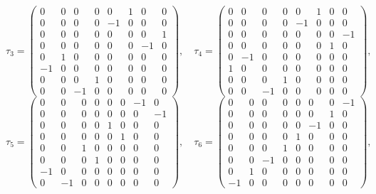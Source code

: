 \documentclass[10pt,a4paper]{article}
\begin{document}
\begin{equation*}
\tau_3=\begin{pmatrix}0 & 0 & 0 & 0 & 0 & 1 & 0 & 0 \\ 0 & 0 & 0 & 0 & -1 & 0 & 0 & 0 \\ 0 & 0 & 0 & 0 & 0 & 0 & 0 & 1 \\ 0 & 0 & 0 & 0 & 0 & 0 & -1 & 0 \\ 0 & 1 & 0 & 0 & 0 & 0 & 0 & 0 \\ -1 & 0 & 0 & 0 & 0 & 0 & 0 & 0 \\ 0 & 0 & 0 & 1 & 0 & 0 & 0 & 0 \\ 0 & 0 & -1 & 0 & 0 & 0 & 0 & 0\end{pmatrix},\quad \tau_4=\begin{pmatrix}0 & 0 & 0 & 0 & 0 & 1 & 0 & 0 \\ 0 & 0 & 0 & 0 & -1 & 0 & 0 & 0 \\ 0 & 0 & 0 & 0 & 0 & 0 & 0 & -1 \\ 0 & 0 & 0 & 0 & 0 & 0 & 1 & 0 \\ 0 & -1 & 0 & 0 & 0 & 0 & 0 & 0 \\ 1 & 0 & 0 & 0 & 0 & 0 & 0 & 0 \\ 0 & 0 & 0 & 1 & 0 & 0 & 0 & 0 \\ 0 & 0 & -1 & 0 & 0 & 0 & 0 & 0\end{pmatrix},
\end{equation*}
\begin{equation*}
\tau_5=\begin{pmatrix}0 & 0 & 0 & 0 & 0 & 0 & -1 & 0 \\ 0 & 0 & 0 & 0 & 0 & 0 & 0 & -1 \\ 0 & 0 & 0 & 0 & 1 & 0 & 0 & 0 \\ 0 & 0 & 0 & 0 & 0 & 1 & 0 & 0 \\ 0 & 0 & 1 & 0 & 0 & 0 & 0 & 0 \\ 0 & 0 & 0 & 1 & 0 & 0 & 0 & 0 \\ -1 & 0 & 0 & 0 & 0 & 0 & 0 & 0 \\ 0 & -1 & 0 & 0 & 0 & 0 & 0 & 0\end{pmatrix},\quad \tau_6=\begin{pmatrix}0 & 0 & 0 & 0 & 0 & 0 & 0 & -1 \\ 0 & 0 & 0 & 0 & 0 & 0 & 1 & 0 \\ 0 & 0 & 0 & 0 & 0 & -1 & 0 & 0 \\ 0 & 0 & 0 & 0 & 1 & 0 & 0 & 0 \\ 0 & 0 & 0 & 1 & 0 & 0 & 0 & 0 \\ 0 & 0 & -1 & 0 & 0 & 0 & 0 & 0 \\ 0 & 1 & 0 & 0 & 0 & 0 & 0 & 0 \\ -1 & 0 & 0 & 0 & 0 & 0 & 0 & 0\end{pmatrix},
\end{equation*}
\end{document}

